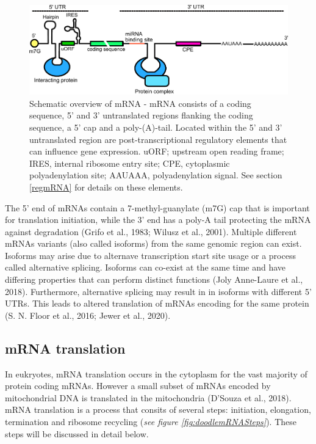 \documentclass[12pt,openany]{book}
\begin{document}
\begin{figure}[H]
  \includegraphics{./figures/UTRFeatures_2.pdf}
  \caption{ Schematic overview of mRNA - mRNA consists of a coding sequence, 5' and 3' untranslated regions flanking the coding sequence, a 5' cap and a poly-(A)-tail. Located within the 5' and 3' untranslated region are post-transcriptional regulatory elements that can influence gene expression. uORF; upstream open reading frame; IRES, internal ribosome entry site; CPE, cytoplasmic polyadenylation site; AAUAAA, polyadenylation signal. See section \ref{regmRNA} for details on these elements.
 \label{fig:UTRFeat}}
\end{figure}

The 5' end of mRNAs contain a 7-methyl-guanylate (m7G) cap that is
important for translation initiation, while the 3' end has a poly-A tail
protecting the mRNA against degradation (Grifo et al., 1983; Wilusz et
al., 2001). Multiple different mRNAs variants (also called isoforms)
from the same genomic region can exist. Isoforms may arise due to
alternave transcription start site usage or a process called alternative
splicing. Isoforms can co-exist at the same time and have differing
properties that can perform distinct functions (Joly Anne-Laure et al.,
2018). Furthermore, alternative splicing may result in in isoforms with
different 5' UTRs. This leads to altered translation of mRNAs encoding
for the same protein (S. N. Floor et al., 2016; Jewer et al., 2020).

\subsection{mRNA translation} \label{translation}

In eukryotes, mRNA translation occurs in the cytoplasm for the vast
majority of protein coding mRNAs. However a small subset of mRNAs
encoded by mitochondrial DNA is translated in the mitochondria (D'Souza
et al., 2018). mRNA translation is a process that consits of several
steps: initiation, elongation, termination and ribosome recycling
(\emph{see figure \ref{fig:doodlemRNASteps}}). These steps will be
discussed in detail below.
\end{document}
